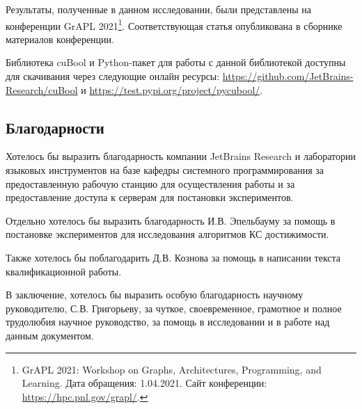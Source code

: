 Результаты, полученные в данном исследовании, были представлены на конференции GrAPL 2021\footnote{GrAPL 2021: Workshop on Graphs, Architectures, Programming, and Learning. Дата обращения: 1.04.2021. Сайт конференции: \url{https://hpc.pnl.gov/grapl/}.}. Соответствующая статья опубликована в сборнике материалов конференции.

Библиотека cuBool и Python-пакет для работы с данной библиотекой доступны для скачивания через следующие онлайн ресурсы: \url{https://github.com/JetBrains-Research/cuBool} и \url{https://test.pypi.org/project/pycubool/}.

\subsection*{Благодарности}

Хотелось бы выразить благодарность компании JetBrains Research и лаборатории языковых инструментов на базе кафедры системного программирования за предоставленную рабочую станцию для осуществления работы и за предоставление доступа к серверам для постановки экспериментов.

Отдельно хотелось бы выразить благодарность И.В. Эпельбауму за помощь в постановке экспериментов для исследования алгоритмов КС достижимости.

Также хотелось бы поблагодарить Д.В. Кознова за помощь в написании текста квалификационной работы.

В заключение, хотелось бы выразить особую благодарность научному руководителю, С.В. Григорьеву, за чуткое, своевременное, грамотное и полное трудолюбия научное руководство, за помощь в исследовании и в работе над данным документом. 

